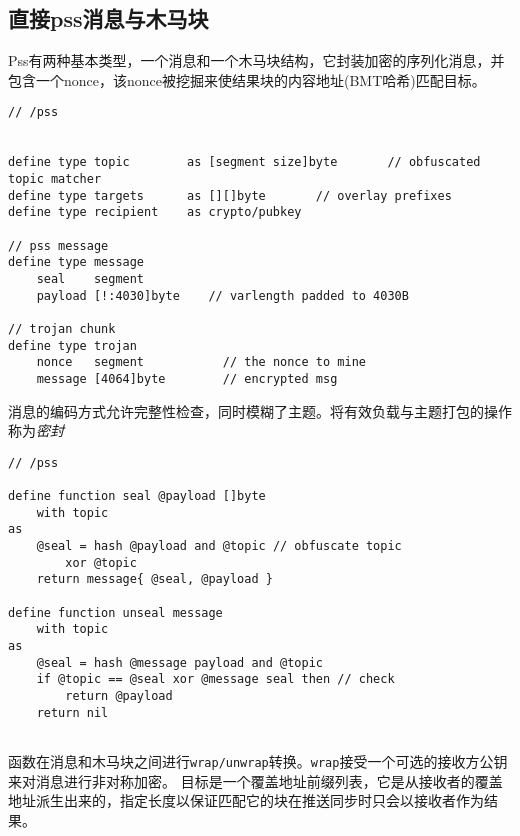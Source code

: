 \subsection{直接pss消息与木马块}

Pss有两种基本类型，一个消息和一个木马块结构，它封装加密的序列化消息，并包含一个nonce，该nonce被挖掘来使结果块的内容地址(BMT哈希)匹配目标。


\begin{definition}\label{def:pss-message}
\begin{lstlisting}[language=buzz1]
// /pss


define type topic        as [segment size]byte       // obfuscated topic matcher
define type targets      as [][]byte       // overlay prefixes 
define type recipient    as crypto/pubkey

// pss message
define type message 
    seal    segment            
    payload [!:4030]byte    // varlength padded to 4030B
    
// trojan chunk
define type trojan 
    nonce   segment           // the nonce to mine 
    message [4064]byte        // encrypted msg 
\end{lstlisting}
\end{definition}


消息的编码方式允许完整性检查，同时模糊了主题。将有效负载与主题打包的操作称为\emph{密封}


\begin{definition}\label{def:pss-sealing}
\begin{lstlisting}[language=buzz1]
// /pss

define function seal @payload []byte
    with topic
as
    @seal = hash @payload and @topic // obfuscate topic
        xor @topic          
    return message{ @seal, @payload }

define function unseal message
    with topic 
as
    @seal = hash @message payload and @topic 
    if @topic == @seal xor @message seal then // check 
        return @payload 
    return nil
    
\end{lstlisting}
\end{definition}

函数在消息和木马块之间进行\lstinline{wrap/unwrap}转换。\lstinline{wrap}接受一个可选的接收方公钥来对消息进行非对称加密。
目标是一个覆盖地址前缀列表，它是从接收者的覆盖地址派生出来的，指定长度以保证匹配它的块在推送同步时只会以接收者作为结果。   

